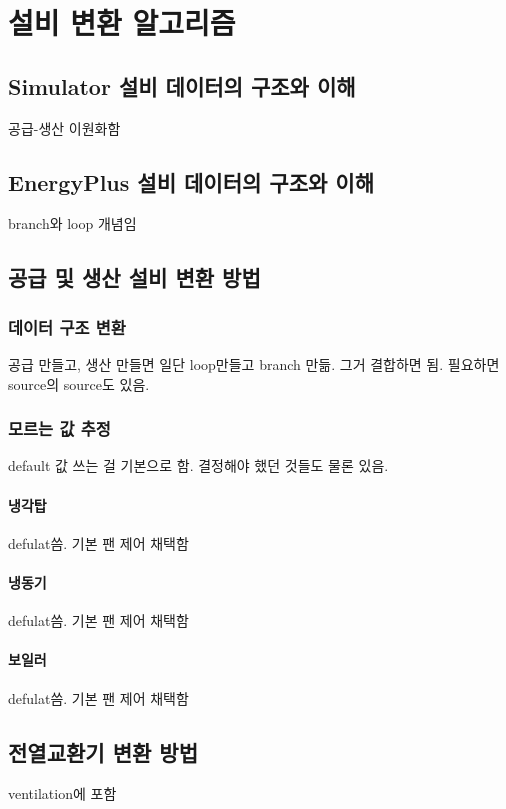 
\section{설비 변환 알고리즘}
\subsection{Simulator 설비 데이터의 구조와 이해}
공급-생산 이원화함

\subsection{EnergyPlus 설비 데이터의 구조와 이해}
branch와 loop 개념임

\subsection{공급 및 생산 설비 변환 방법}
\subsubsection{데이터 구조 변환}
공급 만들고, 생산 만들면 일단 loop만들고 branch 만듦.
그거 결합하면 됨.
필요하면 source의 source도 있음.

\subsubsection{모르는 값 추정}
default 값 쓰는 걸 기본으로 함. 결정해야 했던 것들도 물론 있음.
\paragraph{냉각탑} defulat씀. 기본 팬 제어 채택함
\paragraph{냉동기} defulat씀. 기본 팬 제어 채택함
\paragraph{보일러} defulat씀. 기본 팬 제어 채택함

\subsection{전열교환기 변환 방법}
ventilation에 포함

